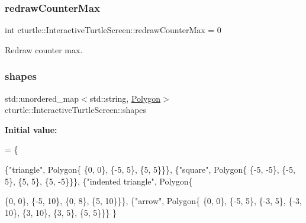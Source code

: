 \subsubsection{\texorpdfstring{redraw\+Counter\+Max}{redrawCounterMax}}
{\footnotesize\ttfamily int cturtle\+::\+Interactive\+Turtle\+Screen\+::redraw\+Counter\+Max = 0\hspace{0.3cm}{\ttfamily [protected]}}

Redraw counter max. \mbox{\label{classcturtle_1_1InteractiveTurtleScreen_ac11df426fc4bc95a516e5491af3f0c7e}} 
\subsubsection{\texorpdfstring{shapes}{shapes}}
{\footnotesize\ttfamily std\+::unordered\+\_\+map$<$std\+::string, \hyperlink{classcturtle_1_1Polygon}{Polygon}$>$ cturtle\+::\+Interactive\+Turtle\+Screen\+::shapes\hspace{0.3cm}{\ttfamily [protected]}}

{\bfseries Initial value\+:}
\begin{DoxyCode}
= \{
            
            \{\textcolor{stringliteral}{"triangle"},
                Polygon\{
                    \{0, 0\},
                    \{-5, 5\},
                    \{5, 5\}\}\},
            \{\textcolor{stringliteral}{"square"},
                Polygon\{
                    \{-5, -5\},
                    \{-5, 5\},
                    \{5, 5\},
                    \{5, -5\}\}\},
            \{\textcolor{stringliteral}{"indented triangle"},
                Polygon\{
                    
                    \{0, 0\},
                    \{-5, 10\},
                    \{0, 8\},
                    \{5, 10\}\}\},
            \{\textcolor{stringliteral}{"arrow"},
                Polygon\{
                    \{0, 0\},
                    \{-5, 5\},
                    \{-3, 5\},
                    \{-3, 10\},
                    \{3, 10\},
                    \{3, 5\},
                    \{5, 5\}\}\}
        \}
\end{DoxyCode}
\mbox{\label{classcturtle_1_1InteractiveTurtleScreen_ae227fdb4ee9017964e314d6e0c76cee4}} 
